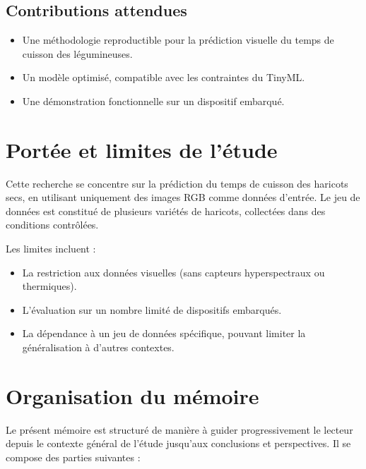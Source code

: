 \subsection{Contributions attendues}
\begin{itemize}
	\item Une méthodologie reproductible pour la prédiction visuelle du temps de cuisson des légumineuses.
	\item Un modèle optimisé, compatible avec les contraintes du TinyML.
	\item Une démonstration fonctionnelle sur un dispositif embarqué.
\end{itemize}

\section{Portée et limites de l’étude}
Cette recherche se concentre sur la prédiction du temps de cuisson des haricots secs, en utilisant uniquement des images RGB comme données d’entrée. Le jeu de données est constitué de plusieurs variétés de haricots, collectées dans des conditions contrôlées.

Les limites incluent :
\begin{itemize}
	\item La restriction aux données visuelles (sans capteurs hyperspectraux ou thermiques).
	\item L’évaluation sur un nombre limité de dispositifs embarqués.
	\item La dépendance à un jeu de données spécifique, pouvant limiter la généralisation à d’autres contextes.
\end{itemize}

\section{Organisation du mémoire}
Le présent mémoire est structuré de manière à guider progressivement le lecteur depuis le contexte général de l’étude jusqu’aux conclusions et perspectives. Il se compose des parties suivantes :

